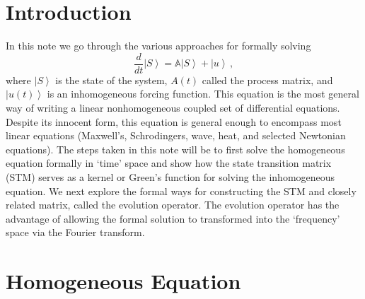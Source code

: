 \documentclass[10pt]{article}
\begin{document}
\section{Introduction}
In this note we go through the various approaches for formally solving  
\[
 \frac{d}{dt} \left| S \right> = {\mathbb A} \left| S \right> + \left| u \right> \, ,
\]
where $\left| S \right>$ is the state of the system, $A(t)$ called the process
matrix, and $\left| u(t) \right>$ is an inhomogeneous forcing function. 
This equation is the most general way of writing a linear nonhomogeneous coupled set 
of differential equations.  Despite its innocent form, this equation is 
general enough to encompass most linear equations (Maxwell's, Schrodingers, wave, 
heat, and selected Newtonian equations).  The steps taken in this note will be to first
solve the homogeneous equation formally in `time' space and show how the
state transition matrix (STM) serves as a kernel or Green's function
for solving the inhomogeneous equation.  We next explore the formal ways
for constructing the STM and closely related matrix, called the evolution
operator.  The evolution operator has the advantage of allowing the formal
solution to transformed into the `frequency' space via the Fourier transform.
 
\section{Homogeneous Equation}
\end{document}
